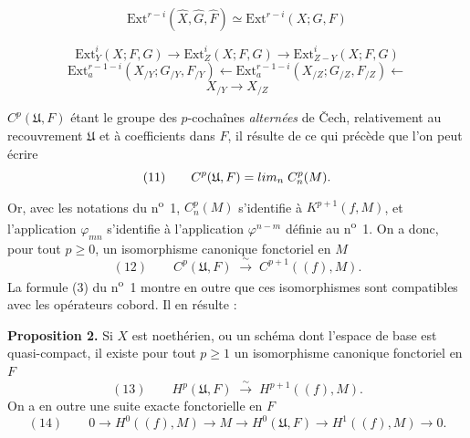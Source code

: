 \documentclass[11pt,a4paper]{article}
\begin{document}
\[
  \mathrm{Ext}^{r-i}(\hat{X}, \hat{G}, \hat{F}) \simeq \mathrm{Ext}^{r-i}(X; G, F)
\]




\[
  \mathrm{Ext}^{i}_{Y}(X; F, G) \longrightarrow \mathrm{Ext}^{i}_{Z}(X; F, G)
  \longrightarrow \mathrm{Ext}^{i}_{Z-Y}(X; F, G)
\]
\[
  \mathrm{Ext}^{r-1-i}_{a}\!\left(X_{/Y}; G_{/Y}, F_{/Y}\right) \longleftarrow
  \mathrm{Ext}^{r-1-i}_{a}\!\left(X_{/Z}; G_{/Z}, F_{/Z}\right) \longleftarrow
\]
\[
  X_{/Y} \longrightarrow X_{/Z}
\]



$C^{p}(\mathfrak{U}, F)$ étant le groupe des $p$-cochaînes \emph{alternées} de
Čech, relativement au recouvrement $\mathfrak{U}$ et à coefficients dans $F$,
il résulte de ce qui précède que l'on peut écrire
\[
  (11) \qquad C^{p}(\mathfrak{U}, F) = \varinjlim_{n}\; C^{p}_{n}(M) .
\]
Or, avec les notations du n\textsuperscript{o}~1, $C^{p}_{n}(M)$ s'identifie à
$K^{p+1}(f, M)$, et l'application $\varphi_{mn}$ s'identifie à l'application
$\varphi^{n-m}$ définie au n\textsuperscript{o}~1. On a donc, pour tout
$p \geqslant 0$, un isomorphisme canonique fonctoriel en $M$
\[
  (12) \qquad C^{p}(\mathfrak{U}, F) \;\xrightarrow{\ \sim\ }\;
  C^{p+1}\!\left((f), M\right) .
\]
La formule (3) du n\textsuperscript{o}~1 montre en outre que ces isomorphismes
sont compatibles avec les opérateurs cobord. Il en résulte :

\textbf{Proposition 2.} Si $X$ est  noethérien, ou
\struck{\ill{}} un schéma dont l'espace de base est quasi-compact, il existe
pour tout $p \geqslant 1$ un isomorphisme canonique fonctoriel en $F$
\[
  (13) \qquad H^{p}(\mathfrak{U}, F) \;\xrightarrow{\ \sim\ }\;
  H^{p+1}\!\left((f), M\right) .
\]
On a en outre une suite exacte fonctorielle en $F$
\[
  (14) \qquad 0 \to H^{0}\!\left((f), M\right) \to M \to
  H^{0}(\mathfrak{U}, F) \to H^{1}\!\left((f), M\right) \to 0 .
\]
\end{document}
